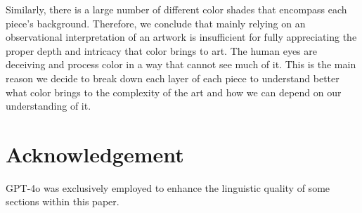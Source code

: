 \documentclass{article}
\begin{document}
Similarly, there is a large number of different color shades that
encompass each piece's background. Therefore, we conclude that mainly
relying on an observational interpretation of an artwork is insufficient
for fully appreciating the proper depth and intricacy that color brings
to art. The human eyes are deceiving and process color in a way that
cannot see much of it. This is the main reason we decide to break down
each layer of each piece to understand better what color brings to the
complexity of the art and how we can depend on our understanding of it.

\section{Acknowledgement}
GPT-4o was exclusively employed to enhance the linguistic quality of some sections within this paper.

\newpage

  
\end{document}
